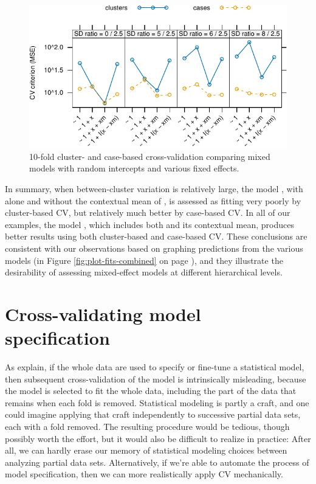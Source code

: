 \documentclass[
]{jss}
\begin{document}
\begin{CodeChunk}
\begin{figure}

{\centering \includegraphics[width=0.75\linewidth]{Figures/cross-validation-data-plot-1}

}

\caption[10-fold cluster- and case-based cross-validation comparing mixed models with random intercepts and various fixed effects]{10-fold cluster- and case-based cross-validation comparing mixed models with random intercepts and various fixed effects.}\label{fig:cross-validation-data-plot}
\end{figure}
\end{CodeChunk}

In summary, when between-cluster variation is relatively large, the
model , with  alone and without the contextual
mean  of , is assessed as fitting very poorly by
cluster-based CV, but relatively much better by case-based CV. In all of
our examples, the model , which includes both
 and its contextual mean, produces better results using both
cluster-based and case-based CV. These conclusions are consistent with
our observations based on graphing predictions from the various models
(in Figure \ref{fig:plot-fits-combined} on page
\pageref{fig:plot-fits-combined}), and they illustrate the desirability
of assessing mixed-effect models at different hierarchical levels.

\section{Cross-validating model
specification}\label{cross-validating-model-specification}

As \citet[Sec. 7.10.2: ``The Wrong and Right Way to Do
Cross-validation'']{HastieTibshiraniFriedman:2009} explain, if the whole
data are used to specify or fine-tune a statistical model, then
subsequent cross-validation of the model is intrinsically misleading,
because the model is selected to fit the whole data, including the part
of the data that remains when each fold is removed. Statistical modeling
is partly a craft, and one could imagine applying that craft
independently to successive partial data sets, each with a fold removed.
The resulting procedure would be tedious, though possibly worth the
effort, but it would also be difficult to realize in practice: After
all, we can hardly erase our memory of statistical modeling choices
between analyzing partial data sets. Alternatively, if we're able to
automate the process of model specification, then we can more
realistically apply CV mechanically.
\end{document}
